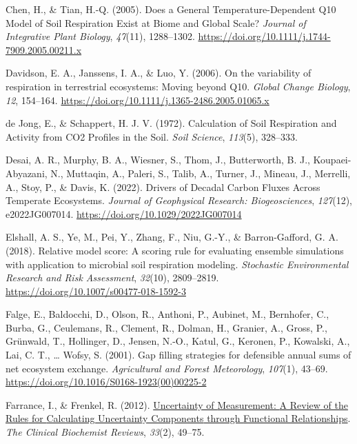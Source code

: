 \documentclass[
  letterpaper,
  DIV=11,
  numbers=noendperiod]{scrartcl}
\newlength{\cslhangindent}
\newenvironment{CSLReferences}[2] %
 {\begin{list}{}{%
  \setlength{\itemindent}{0pt}
  \setlength{\leftmargin}{0pt}
  \setlength{\parsep}{0pt}
  \ifodd #1
   \setlength{\leftmargin}{\cslhangindent}
   \setlength{\itemindent}{-1\cslhangindent}
  \fi
  \setlength{\itemsep}{#2\baselineskip}}}
 {\end{list}}
\begin{document}
\begin{CSLReferences}{1}{0}
Chen, H., \& Tian, H.-Q. (2005). Does a {General Temperature-Dependent
Q10 Model} of {Soil Respiration Exist} at {Biome} and {Global Scale}?
\emph{Journal of Integrative Plant Biology}, \emph{47}(11), 1288--1302.
\url{https://doi.org/10.1111/j.1744-7909.2005.00211.x}

Davidson, E. A., Janssens, I. A., \& Luo, Y. (2006). On the variability
of respiration in terrestrial ecosystems: Moving beyond {Q10}.
\emph{Global Change Biology}, \emph{12}, 154--164.
\url{https://doi.org/10.1111/j.1365-2486.2005.01065.x}

de Jong, E., \& Schappert, H. J. V. (1972). Calculation of {Soil
Respiration} and {Activity} from {CO2 Profiles} in the {Soil}.
\emph{Soil Science}, \emph{113}(5), 328--333.

Desai, A. R., Murphy, B. A., Wiesner, S., Thom, J., Butterworth, B. J.,
Koupaei-Abyazani, N., Muttaqin, A., Paleri, S., Talib, A., Turner, J.,
Mineau, J., Merrelli, A., Stoy, P., \& Davis, K. (2022). Drivers of
{Decadal Carbon Fluxes Across Temperate Ecosystems}. \emph{Journal of
Geophysical Research: Biogeosciences}, \emph{127}(12), e2022JG007014.
\url{https://doi.org/10.1029/2022JG007014}

Elshall, A. S., Ye, M., Pei, Y., Zhang, F., Niu, G.-Y., \&
Barron-Gafford, G. A. (2018). Relative model score: A scoring rule for
evaluating ensemble simulations with application to microbial soil
respiration modeling. \emph{Stochastic Environmental Research and Risk
Assessment}, \emph{32}(10), 2809--2819.
\url{https://doi.org/10.1007/s00477-018-1592-3}

Falge, E., Baldocchi, D., Olson, R., Anthoni, P., Aubinet, M.,
Bernhofer, C., Burba, G., Ceulemans, R., Clement, R., Dolman, H.,
Granier, A., Gross, P., Grünwald, T., Hollinger, D., Jensen, N.-O.,
Katul, G., Keronen, P., Kowalski, A., Lai, C. T., \ldots{} Wofsy, S.
(2001). Gap filling strategies for defensible annual sums of net
ecosystem exchange. \emph{Agricultural and Forest Meteorology},
\emph{107}(1), 43--69.
\url{https://doi.org/10.1016/S0168-1923(00)00225-2}

Farrance, I., \& Frenkel, R. (2012).
\href{https://www.ncbi.nlm.nih.gov/pmc/articles/PMC3387884}{Uncertainty
of {Measurement}: {A Review} of the {Rules} for {Calculating Uncertainty
Components} through {Functional Relationships}}. \emph{The Clinical
Biochemist Reviews}, \emph{33}(2), 49--75.


\end{CSLReferences}
\end{document}
